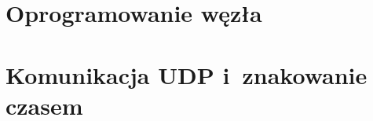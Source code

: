 \section{Oprogramowanie węzła}
\label{sec:oprogramowanie-wezla}


\section{Komunikacja UDP i~znakowanie czasem}
\label{sec:udp}


